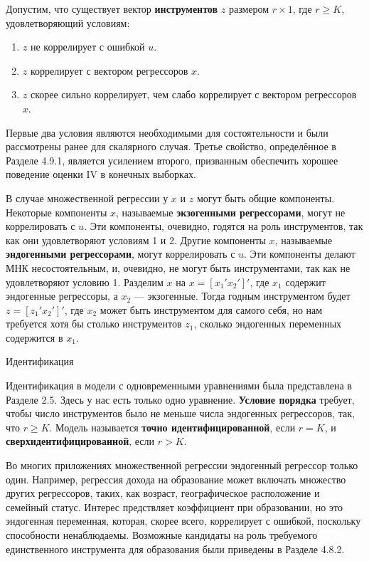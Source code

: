 Допустим, что существует вектор \textbf{инструментов} $z$ размером $r \times 1$, где $r\geq K$, удовлетворяющий условиям:
\begin{small}
\begin{enumerate}
\item $z$ не коррелирует с ошибкой $u$.
\item $z$ коррелирует с вектором регрессоров $x$.
\item $z$ скорее сильно коррелирует, чем слабо коррелирует с вектором регрессоров $x$.
\end{enumerate}
\end{small}
Первые два условия являются необходимыми для состоятельности и были рассмотрены ранее для скалярного случая. Третье свойство, определённое в Разделе 4.9.1, является усилением второго, призванным обеспечить хорошее поведение оценки IV в конечных выборках.

В случае множественной регрессии у $x$ и $z$ могут быть общие компоненты. Некоторые компоненты $x$, называемые \textbf{экзогенными регрессорами}, могут не коррелировать с $u$. Эти компоненты, очевидно, годятся на роль инструментов, так как они удовлетворяют условиям 1 и 2. Другие компоненты $x$, называемые \textbf{эндогенными регрессорами}, могут коррелировать с $u$. Эти компоненты делают МНК несостоятельным, и, очевидно, не могут быть инструментами, так как не удовлетворяют условию 1. Разделим $x$ на $x = [x_1' x_2']'$, где $x_1$ содержит эндогенные регрессоры, а $x_2$ --- экзогенные. Тогда годным инструментом будет $z = [z_1' x_2']'$, где $x_2$ может быть инструментом для самого себя, но нам требуется хотя бы столько инструментов $z_1$, сколько эндогенных переменных содержится в $x_1$. 
\begin{center}
Идентификация
\end{center}
Идентификация в модели с одновременными уравнениями была представлена в Разделе 2.5. Здесь у нас есть только одно уравнение. \textbf{Условие порядка} требует, чтобы число инструментов было не меньше числа эндогенных регрессоров, так, что $r \geq K$. Модель называется \textbf{точно идентифицированной}, если $r=K$, и \textbf{сверхидентифицированной}, если $r>K$.

Во многих приложениях множественной регрессии эндогенный регрессор только один. Например, регрессия дохода на образование  может включать множество других регрессоров, таких, как возраст, географическое расположение и семейный статус. Интерес предствляет коэффициент при образовании, но это эндогенная переменная, которая, скорее всего, коррелирует с ошибкой, поскольку способности ненаблюдаемы. Возможные кандидаты на роль требуемого единственного инструмента для образования были приведены в Разделе 4.8.2.

